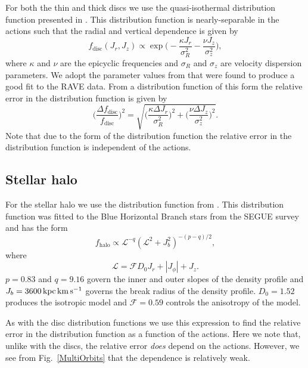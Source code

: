 \documentclass[useAMS,usenatbib,fleqn,a4paper]{mn2e}
\def\kpc{\,{\rm kpc}}
\def\kms{\,{\rm km\,s^{-1}}}
\begin{document}
For both the thin and thick discs we use the quasi-isothermal distribution
function presented in \cite{Binney2010}. This distribution function is
nearly-separable in the actions such that the radial and vertical dependence
is given by
\begin{equation}
f_\mathrm{disc}(J_r,J_z) \propto \exp \Big(-\frac{\kappa J_r}{\sigma_R^2}-\frac{\nu J_z}{\sigma_z^2}\Big),
\end{equation}
where $\kappa$ and $\nu$ are the epicyclic frequencies and $\sigma_R$ and
$\sigma_z$ are velocity dispersion parameters. We adopt the parameter values
from \cite{Piffl2014} that were found to produce a good fit to the RAVE data.
From a distribution function of this form the relative error in the
distribution function is given by
\begin{equation}
\Big(\frac{\Delta f_\mathrm{disc}}{f_\mathrm{disc}}\Big)^2 = \sqrt{\Big(\frac{\kappa\Delta J_r}{\sigma_R^2}\Big)^2+\Big(\frac{\nu\Delta J_z}{\sigma_z^2}\Big)^2}.
\end{equation}
Note that due to the form of the distribution function the relative error in
the distribution function is independent of the actions.

\subsection{Stellar halo}

For the stellar halo we use the distribution function from
\cite{WilliamsEvans2015}. This distribution function was fitted to the Blue
Horizontal Branch stars from the SEGUE survey and has the form
\begin{equation}
f_\mathrm{halo}\propto \mathcal{L}^{-q}(\mathcal{L}^2+J_b^2)^{-(p-q)/2},
\end{equation}
where
\begin{equation}
\mathcal{L} = \mathcal{F}D_0 J_r+|J_\phi|+J_z.
\end{equation}
$p=0.83$ and $q=9.16$ govern the inner and outer slopes of the density
profile and $J_b=3600\kpc\kms$ governs the break radius of the density
profile. $D_0=1.52$ produces the isotropic model and $\mathcal{F}=0.59$
controls the anisotropy of the model.

As with the disc distribution functions we use this expression to find the
relative error in the distribution function as a function of the actions.
Here we note that, unlike with the discs, the relative error \emph{does}
depend on the actions. However, we see from Fig.~\ref{MultiOrbits} that the
dependence is relatively weak.
\end{document}
